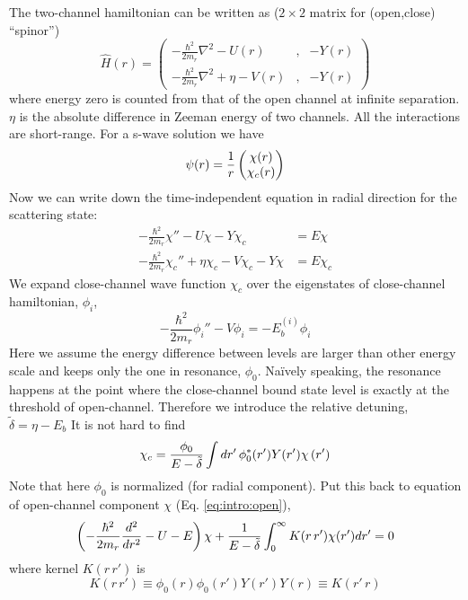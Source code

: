 The two-channel hamiltonian can be written as ($2\times2$ matrix for  (open,close) ``spinor'')
\begin{equation}
\hat{H}(r)=
\begin{pmatrix}
-\frac{\hbar^{2}}{2m_{r}}\nabla^{2}-U(r)&,&-Y(r)\\
-\frac{\hbar^{2}}{2m_{r}}\nabla^{2}+\eta-V(r)&,&-Y(r)
\end{pmatrix}
\end{equation}
where energy zero is counted from that of the open channel at infinite separation. $\eta$ is the absolute difference in Zeeman energy of two channels.  All the interactions are short-range.  For a s-wave solution we have 
\begin{equation}
\psi(r)=\frac{1}{r}\begin{pmatrix}\chi(r)\\\chi_{c}(r)\end{pmatrix}
\end{equation}
Now we can write down the time-independent \sch equation in radial direction for the scattering state:
\begin{align}
-\frac{\hbar^{2}}{2m_{r}}\chi''-U\chi-Y\chi_c&=E\chi\label{eq:intro:open}\\
-\frac{\hbar^{2}}{2m_{r}}\chi_c''+\eta\chi_c-V\chi_c-Y\chi&=E\chi_c
\end{align}
We expand close-channel wave function $\chi_{c}$ over the eigenstates of close-channel hamiltonian, $\phi_{i}$, 
\begin{equation}
-\frac{\hbar^{2}}{2m_{r}}\phi_{i}''-V \phi_{i}=-E_{b}^{(i)}\phi_{i}
\end{equation}
Here we assume the energy difference between levels are larger than other energy scale and keeps only the one in resonance, $\phi_{0}$.  Na\"{i}vely speaking, the resonance happens at the point where the close-channel bound state level is exactly at the threshold of open-channel.  Therefore we introduce the relative detuning, $\tilde\delta=\eta-E_{b}$ It is not hard to find
\begin{equation}
\chi_{c}=\frac{\phi_{0}}{E-\tilde\delta}\int{dr'}\,\phi_{0}^{*}(r')Y(r')\chi\left(r'\right)
\end{equation}
Note that here $\phi_{0}$ is normalized (for radial component).  Put this back to \sch equation of open-channel component $\chi$ (Eq. \ref{eq:intro:open}), 
\begin{equation}\label{eq:intro:chi}
\left(-\frac{\hbar^{2}}{2m_{r}}\frac{d^{2}}{dr^{2}}-U-E\right)\chi+\frac{1}{E-\tilde\delta}\int_{0}^{\infty}K(r\,r')\chi(r')dr'=0
\end{equation}
where kernel $K(r\,r')$ is
\begin{equation}
K(r\,r')\equiv\phi_{0}(r)\phi_{0}(r')Y(r')Y(r)\equiv{}K(r'\,r)
\end{equation}

